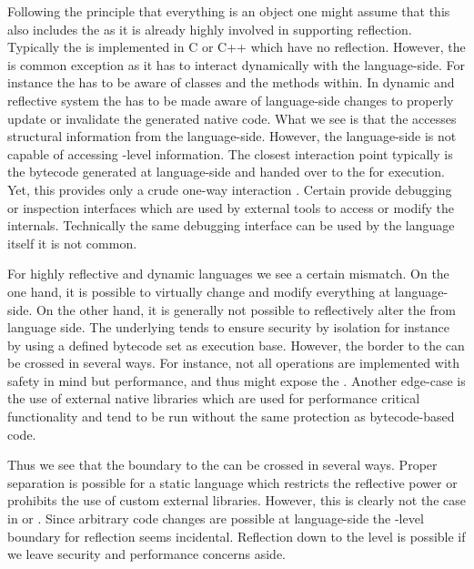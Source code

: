 Following the principle that everything is an object one might assume that this also includes the \VM as it is already highly involved in supporting reflection.
Typically the \VM is implemented in C or C++ which have no reflection.
However, the \JIT is common exception as it has to interact dynamically with the language-side.
For instance the \JIT has to be aware of classes and the methods within.
In dynamic and reflective system the \JIT has to be made aware of language-side changes to properly update or invalidate the generated native code.
What we see is that the \JIT accesses structural information from the language-side.
However, the language-side is not capable of accessing \VM-level information.
The closest \VM interaction point typically is the bytecode generated at language-side and handed over to the \VM for execution.
Yet, this provides only a crude one-way interaction \cite{Kell12a}.
Certain \VMs provide debugging or inspection interfaces which are used by external tools to access or modify the \VM internals.
Technically the same \VM debugging interface can be used by the language itself it is not common.

For highly reflective and dynamic languages we see a certain mismatch.
On the one hand, it is possible to virtually change and modify everything at language-side.
On the other hand, it is generally not possible to reflectively alter the \VM from language side.
The underlying \VM tends to ensure security by isolation for instance by using a defined bytecode set as execution base.
However, the border to the \VM can be crossed in several ways.
For instance, not all operations are implemented with safety in mind but performance, and thus might expose the \VM.
Another edge-case is the use of external native libraries which are used for performance critical functionality and tend to be run without the same protection as bytecode-based code.

Thus we see that the boundary to the \VM can be crossed in several ways.
Proper separation is possible for a static language which restricts the reflective power or prohibits the use of custom external libraries.
However, this is clearly not the case in \PH or \ST.
Since arbitrary code changes are possible at language-side the \VM-level boundary for reflection seems incidental.
Reflection down to the \VM level is possible if we leave security and performance concerns aside.

